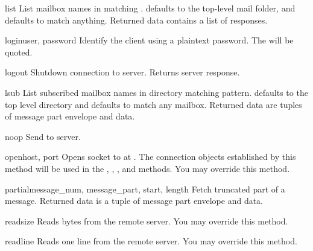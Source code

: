 \begin{methoddesc}{list}{}
  List mailbox names in  matching
  .   defaults to the top-level mail
  folder, and  defaults to match anything.  Returned data
  contains a list of  responses.
\end{methoddesc}

\begin{methoddesc}{login}{user, password}
  Identify the client using a plaintext password.
  The  will be quoted.
\end{methoddesc}

\begin{methoddesc}{logout}{}
  Shutdown connection to server. Returns server  response.
\end{methoddesc}

\begin{methoddesc}{lsub}{}
  List subscribed mailbox names in directory matching pattern.
   defaults to the top level directory and
   defaults to match any mailbox.
  Returned data are tuples of message part envelope and data.
\end{methoddesc}

\begin{methoddesc}{noop}{}
  Send  to server.
\end{methoddesc}

\begin{methoddesc}{open}{host, port}
  Opens socket to  at .
  The connection objects established by this method
  will be used in the , , , and  methods.
  You may override this method.
\end{methoddesc}

\begin{methoddesc}{partial}{message_num, message_part, start, length}
  Fetch truncated part of a message.
  Returned data is a tuple of message part envelope and data.
\end{methoddesc}

\begin{methoddesc}{read}{size}
  Reads  bytes from the remote server.
  You may override this method.
\end{methoddesc}

\begin{methoddesc}{readline}{}
  Reads one line from the remote server.
  You may override this method.
\end{methoddesc}

